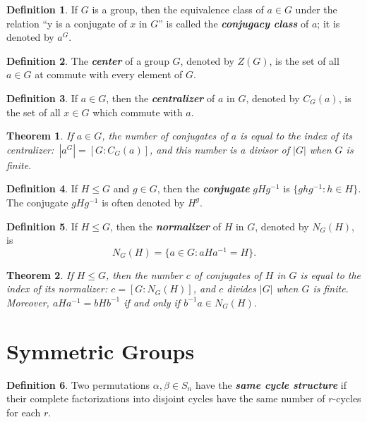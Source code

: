 \documentclass[12pt]{report}
\newtheorem{theorem}{Theorem}[chapter]
\theoremstyle{definition}
\newtheorem*{definition}{Definition}
\newcommand{\term}[1]{\textbf{\textit{#1}}}
\begin{document}
\begin{definition}
	If $G$ is a group, then the equivalence class of $a\in G$ under the relation “y is a conjugate of $x$ in $G$” is called the \term{conjugacy class} of $a$; it is denoted by $a^G$.
\end{definition}

\begin{definition}
	The \term{center} of a group $G$, denoted by $Z(G)$, is the set of all $a\in G$ at commute with every element of $G$.
\end{definition}

\begin{definition}
	If $a\in G$, then the \term{centralizer} of $a$ in $G$, denoted by $C_G(a)$, is the set of all $x\in G$ which commute with $a$.
\end{definition}

\begin{theorem}
	If $a\in G$, the number of conjugates of $a$ is equal to the index of its centralizer:\
	$|a^G|=[G:C_G(a)]$, and this number is a divisor of $|G|$ when $G$ is finite.
\end{theorem}

\begin{definition}
	If $H\leq G$ and $g\in G$, then the \term{conjugate} $gHg^{-1}$ is $\{ghg^{-1}:h\in H\}$. The conjugate $gHg^{-1}$ is often denoted by $H^g$.
\end{definition}

\begin{definition}
	If $H\leq G$, then the \term{normalizer} of $H$ in $G$, denoted by $N_G(H)$, is
	\[N_G(H)=\{a\in G:aHa^{-1}=H\}.\]
\end{definition}

\begin{theorem}
	If $H\leq G$, then the number $c$ of conjugates of $H$ in $G$ is equal to the index of its normalizer: $c=[G:N_G(H)]$, and $c$ divides $|G|$ when $G$ is finite.
	Moreover, $aHa^{-1}=bHb^{-1}$ if and only if $b^{-1}a\in N_G(H)$.
\end{theorem}

\section{Symmetric Groups}

\begin{definition}
	Two permutations $\alpha,\beta\in S_n$ have the \term{same cycle structure} if their complete factorizations into disjoint
	cycles have the same number of $r$-cycles for each $r$.
\end{definition}
\end{document}
